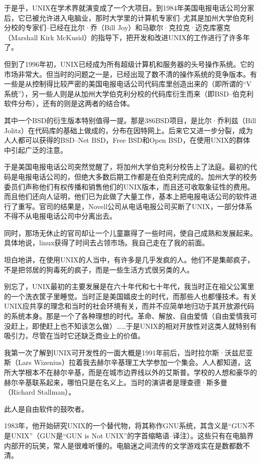 于是乎，UNIX在学术界就演变成了一个大项目。到1984年美国电报电话公司分家后，它已被允许进入电脑业，那时大学里的计算机专家们--尤其是加州大学伯克利分校的专家们--已经在比尔·乔（Bill Joy）和马歇尔·克拉克·迈克库塞克（Marshall Kirk McKusid）的指导下，把开发和改进UNIX的工作进行了许多年了。

但到了1996年初，UNIX已经成为所有超级计算机和服务器的头号操作系统。它的市场非常大。但当时的问题之一是，已经出现了数不清的操作系统的竞争版本。有一些是从控制得比较严密的美国电报电话公司代码库里创造出来的（即所谓的“V系统”），另一些人则是从加州大学伯克利分校的代码库衍生而来（即BSD--伯克利软件分布），还有的则是这两者的结合体。

其中一个BSD的衍生版本特别值得一提。那是386BSD项目，是比尔·乔利兹（Bill Jolitz）在代码库的基础上做成的，分布在因特网上。后来它又进一步分裂，成为人人都可以获得的BSD--Net BSD，Free BSD和Open BSD，在使用UNIX的群体中引起广泛的注意。

于是美国电报电话公司突然觉醒了，将加州大学伯克利分校告上了法庭。最初的代码是电报电话公司的，但绝大多数后期工作都是在伯克利完成的。加州大学的校务委员们声称他们有权传播和销售他们的UNIX版本，而且还可收取象征性的费用。而且他们还向人证明，他们已为此做了大量工作，基本上把电报电话公司的软件进行了重写。官司的结果是，Novell公司从电话电报公司买断了UNIX，一部分体系不得不从电报电话公司中分离出去。

同时，那场无休止的官司却让一个儿童赢得了一些时间，使自己成熟和发展起来。具体地说，linux获得了时间去占领市场。我自己走在了我的前面。

坦白地讲，在使用UNIX的人当中，有许多是几乎发疯的人。他们不是集邮疯子，不是把邻居的狗毒死的疯子，而是一些生活方式很另类的人。

别忘了，UNIX最初的主要发展是在六十年代和七十年代，我当时正在祖父公寓里的一个洗衣筐子里睡觉。当时正是美国嬉皮士的时代，而那些人也都懂技术。有关UNIX应共享的理念和当时的社会环境有关，而并不应简单地归功于其开放源代码的系统本身。那是一个了各种理想的时代。革命、解放、自由爱情（自由爱情我可没赶上，即使赶上也不知该怎么做）……于是UNIX的相对开放性对这类人就特别有吸引力，尽管在当时它还缺乏商业上的价值。

我第一次了解到UNIX可开发性的一面大概是1991年前后，当时拉尔斯·沃兹尼亚斯（Lars Wizenius）拉着我去赫尔辛基理工大学参加一个集会。人人都知道，这所大学根本不在赫尔辛基，而是在城市边界线以外的艾斯普。学校的人想和豪华的赫尔辛基联系起来，哪怕只是在名义上。当时的演讲者是理查德·斯多曼（Richard Stallman）。

此人是自由软件的鼓吹者。

1983年，他开始研究UNIX的一个替代物，将其称作GNU系统，其含义是“GUN不是UNIX”（GUN是“GUN is Not UNIX”的字首缩略语--译注）。这些只有在电脑界内部开的玩笑，常人是很难听懂的。电脑迷之间流传的文学游戏实在是数都数不清。


